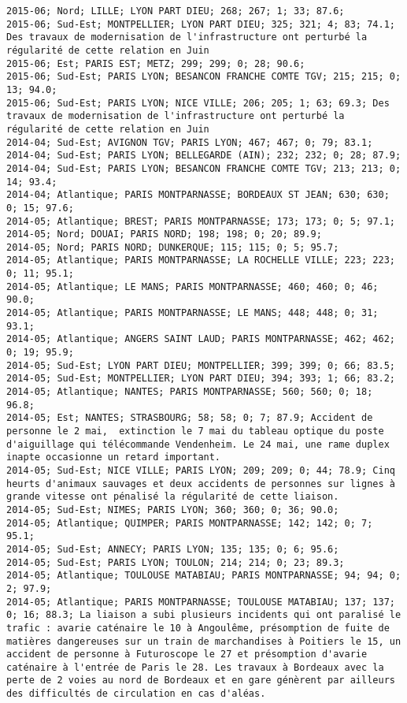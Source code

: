 \documentclass{article}
\begin{document}
\begin{Verbatim}[commandchars=\\\{\}]
2015-06; Nord; LILLE; LYON PART DIEU; 268; 267; 1; 33; 87.6; 
2015-06; Sud-Est; MONTPELLIER; LYON PART DIEU; 325; 321; 4; 83; 74.1; Des travaux de modernisation de l'infrastructure ont perturbé la régularité de cette relation en Juin
2015-06; Est; PARIS EST; METZ; 299; 299; 0; 28; 90.6; 
2015-06; Sud-Est; PARIS LYON; BESANCON FRANCHE COMTE TGV; 215; 215; 0; 13; 94.0; 
2015-06; Sud-Est; PARIS LYON; NICE VILLE; 206; 205; 1; 63; 69.3; Des travaux de modernisation de l'infrastructure ont perturbé la régularité de cette relation en Juin
2014-04; Sud-Est; AVIGNON TGV; PARIS LYON; 467; 467; 0; 79; 83.1; 
2014-04; Sud-Est; PARIS LYON; BELLEGARDE (AIN); 232; 232; 0; 28; 87.9; 
2014-04; Sud-Est; PARIS LYON; BESANCON FRANCHE COMTE TGV; 213; 213; 0; 14; 93.4; 
2014-04; Atlantique; PARIS MONTPARNASSE; BORDEAUX ST JEAN; 630; 630; 0; 15; 97.6; 
2014-05; Atlantique; BREST; PARIS MONTPARNASSE; 173; 173; 0; 5; 97.1; 
2014-05; Nord; DOUAI; PARIS NORD; 198; 198; 0; 20; 89.9; 
2014-05; Nord; PARIS NORD; DUNKERQUE; 115; 115; 0; 5; 95.7; 
2014-05; Atlantique; PARIS MONTPARNASSE; LA ROCHELLE VILLE; 223; 223; 0; 11; 95.1; 
2014-05; Atlantique; LE MANS; PARIS MONTPARNASSE; 460; 460; 0; 46; 90.0; 
2014-05; Atlantique; PARIS MONTPARNASSE; LE MANS; 448; 448; 0; 31; 93.1; 
2014-05; Atlantique; ANGERS SAINT LAUD; PARIS MONTPARNASSE; 462; 462; 0; 19; 95.9; 
2014-05; Sud-Est; LYON PART DIEU; MONTPELLIER; 399; 399; 0; 66; 83.5; 
2014-05; Sud-Est; MONTPELLIER; LYON PART DIEU; 394; 393; 1; 66; 83.2; 
2014-05; Atlantique; NANTES; PARIS MONTPARNASSE; 560; 560; 0; 18; 96.8; 
2014-05; Est; NANTES; STRASBOURG; 58; 58; 0; 7; 87.9; Accident de personne le 2 mai,  extinction le 7 mai du tableau optique du poste d'aiguillage qui télécommande Vendenheim. Le 24 mai, une rame duplex inapte occasionne un retard important.
2014-05; Sud-Est; NICE VILLE; PARIS LYON; 209; 209; 0; 44; 78.9; Cinq heurts d'animaux sauvages et deux accidents de personnes sur lignes à grande vitesse ont pénalisé la régularité de cette liaison.
2014-05; Sud-Est; NIMES; PARIS LYON; 360; 360; 0; 36; 90.0; 
2014-05; Atlantique; QUIMPER; PARIS MONTPARNASSE; 142; 142; 0; 7; 95.1; 
2014-05; Sud-Est; ANNECY; PARIS LYON; 135; 135; 0; 6; 95.6; 
2014-05; Sud-Est; PARIS LYON; TOULON; 214; 214; 0; 23; 89.3; 
2014-05; Atlantique; TOULOUSE MATABIAU; PARIS MONTPARNASSE; 94; 94; 0; 2; 97.9; 
2014-05; Atlantique; PARIS MONTPARNASSE; TOULOUSE MATABIAU; 137; 137; 0; 16; 88.3; La liaison a subi plusieurs incidents qui ont paralisé le trafic : avarie caténaire le 10 à Angoulême, présomption de fuite de matières dangereuses sur un train de marchandises à Poitiers le 15, un accident de personne à Futuroscope le 27 et présomption d'avarie caténaire à l'entrée de Paris le 28. Les travaux à Bordeaux avec la perte de 2 voies au nord de Bordeaux et en gare génèrent par ailleurs des difficultés de circulation en cas d'aléas. 

\end{Verbatim}
\end{document}
